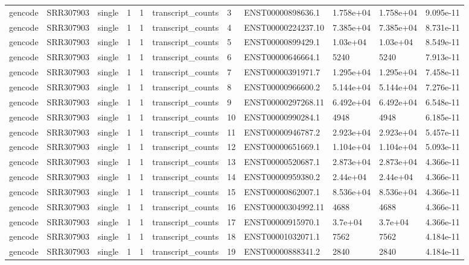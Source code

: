 \begin{tabular}{lllllllllll}
gencode & SRR307903 & single & 1 & 1 & transcript\_counts & 3 & ENST00000898636.1 & 1.758e+04 & 1.758e+04 & 9.095e-11 \\
gencode & SRR307903 & single & 1 & 1 & transcript\_counts & 4 & ENST00000224237.10 & 7.385e+04 & 7.385e+04 & 8.731e-11 \\
gencode & SRR307903 & single & 1 & 1 & transcript\_counts & 5 & ENST00000899429.1 & 1.03e+04 & 1.03e+04 & 8.549e-11 \\
gencode & SRR307903 & single & 1 & 1 & transcript\_counts & 6 & ENST00000646664.1 & 5240 & 5240 & 7.913e-11 \\
gencode & SRR307903 & single & 1 & 1 & transcript\_counts & 7 & ENST00000391971.7 & 1.295e+04 & 1.295e+04 & 7.458e-11 \\
gencode & SRR307903 & single & 1 & 1 & transcript\_counts & 8 & ENST00000966600.2 & 5.144e+04 & 5.144e+04 & 7.276e-11 \\
gencode & SRR307903 & single & 1 & 1 & transcript\_counts & 9 & ENST00000297268.11 & 6.492e+04 & 6.492e+04 & 6.548e-11 \\
gencode & SRR307903 & single & 1 & 1 & transcript\_counts & 10 & ENST00000990284.1 & 4948 & 4948 & 6.185e-11 \\
gencode & SRR307903 & single & 1 & 1 & transcript\_counts & 11 & ENST00000946787.2 & 2.923e+04 & 2.923e+04 & 5.457e-11 \\
gencode & SRR307903 & single & 1 & 1 & transcript\_counts & 12 & ENST00000651669.1 & 1.104e+04 & 1.104e+04 & 5.093e-11 \\
gencode & SRR307903 & single & 1 & 1 & transcript\_counts & 13 & ENST00000520687.1 & 2.873e+04 & 2.873e+04 & 4.366e-11 \\
gencode & SRR307903 & single & 1 & 1 & transcript\_counts & 14 & ENST00000959380.2 & 2.44e+04 & 2.44e+04 & 4.366e-11 \\
gencode & SRR307903 & single & 1 & 1 & transcript\_counts & 15 & ENST00000862007.1 & 8.536e+04 & 8.536e+04 & 4.366e-11 \\
gencode & SRR307903 & single & 1 & 1 & transcript\_counts & 16 & ENST00000304992.11 & 4688 & 4688 & 4.366e-11 \\
gencode & SRR307903 & single & 1 & 1 & transcript\_counts & 17 & ENST00000915970.1 & 3.7e+04 & 3.7e+04 & 4.366e-11 \\
gencode & SRR307903 & single & 1 & 1 & transcript\_counts & 18 & ENST00001032071.1 & 7562 & 7562 & 4.184e-11 \\
gencode & SRR307903 & single & 1 & 1 & transcript\_counts & 19 & ENST00000888341.2 & 2840 & 2840 & 4.184e-11 \\

\end{tabular}
